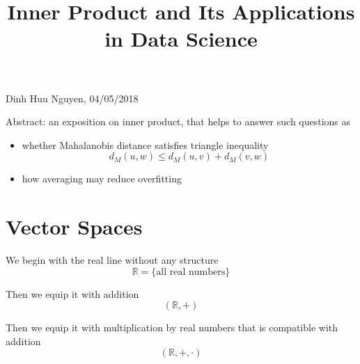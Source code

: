 \documentclass[12pt]{amsart}
\title{Inner Product and Its Applications in Data Science}
\theoremstyle{definition}
\begin{document}
\maketitle

\begin{center}
Dinh Huu Nguyen, 04/05/2018
\end{center}
\vspace{20pt}

Abstract: an exposition on inner product, that helps to answer such questions as
\begin{itemize}
\item whether Mahalanobis distance satisfies triangle inequality
$$d_M(u, w) \leq d_M(u, v) + d_M(v, w)$$
\item how averaging may reduce overfitting
\end{itemize}

\tableofcontents
\vfill
\pagebreak

\section{Vector Spaces} We begin with the real line without any structure
$$\mathbb{R} = \{\text{all real numbers}\}$$
\vspace{20pt}

Then we equip it with addition
$$(\mathbb{R}, +)$$
\vspace{20pt}

Then we equip it with multiplication by real numbers that is compatible with addition
$$(\mathbb{R}, + , \cdot)$$
\vfill
\pagebreak
\end{document}
